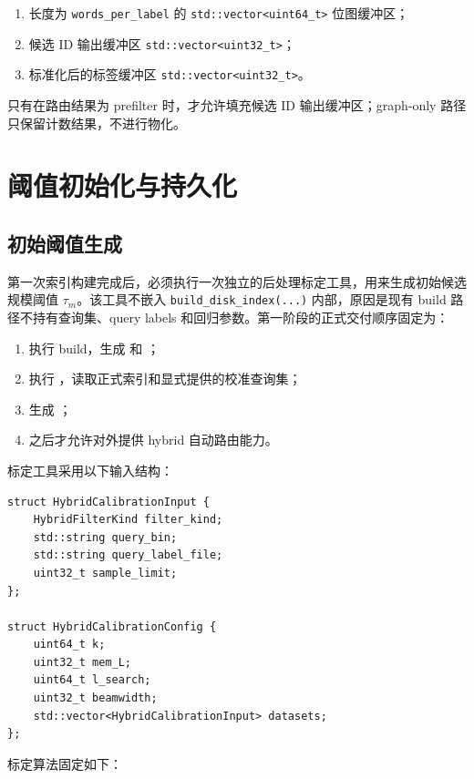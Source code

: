 \documentclass[UTF8]{ctexart}
\begin{document}
\begin{enumerate}
\item 长度为 \texttt{words\_per\_label} 的 \texttt{std::vector<uint64\_t>} 位图缓冲区；
\item 候选 ID 输出缓冲区 \texttt{std::vector<uint32\_t>}；
\item 标准化后的标签缓冲区 \texttt{std::vector<uint32\_t>}。
\end{enumerate}

只有在路由结果为 prefilter 时，才允许填充候选 ID 输出缓冲区；graph-only 路径只保留计数结果，不进行物化。

\section{阈值初始化与持久化}

\subsection{初始阈值生成}
第一次索引构建完成后，必须执行一次独立的后处理标定工具，用来生成初始候选规模阈值 \(\tau_m\)。该工具不嵌入 \texttt{build\_disk\_index(...)} 内部，原因是现有 build 路径不持有查询集、query labels 和回归参数。第一阶段的正式交付顺序固定为：

\begin{enumerate}
\item 执行 build，生成  和 ；
\item 执行 ，读取正式索引和显式提供的校准查询集；
\item 生成 ；
\item 之后才允许对外提供 hybrid 自动路由能力。
\end{enumerate}

标定工具采用以下输入结构：

\begin{verbatim}
struct HybridCalibrationInput {
	HybridFilterKind filter_kind;
	std::string query_bin;
	std::string query_label_file;
	uint32_t sample_limit;
};

struct HybridCalibrationConfig {
	uint64_t k;
	uint32_t mem_L;
	uint64_t l_search;
	uint32_t beamwidth;
	std::vector<HybridCalibrationInput> datasets;
};
\end{verbatim}

标定算法固定如下：
\end{document}

